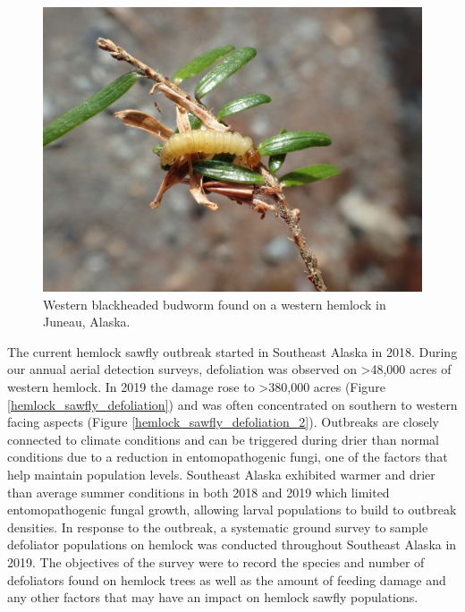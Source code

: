 \begin{multicols}{2} 

\begin{figure}[H]
\begin{center}
\vspace{2mm}
\includegraphics[width=\textwidth]{img/western_blackheaded_budworm_larva.jpg}
\caption{Western blackheaded budworm found on a western hemlock in Juneau, Alaska.}
\label{western_blackheaded_budworm_larva}
\end{center}
\end{figure} 

The current hemlock sawfly outbreak started in Southeast Alaska in 2018.  During our annual aerial detection surveys, defoliation was observed on >48,000 acres of western hemlock.  In 2019 the damage rose to >380,000 acres (Figure \ref{hemlock_sawfly_defoliation}) and was often concentrated on southern to western facing aspects (Figure \ref{hemlock_sawfly_defoliation_2}). Outbreaks are closely connected to climate conditions and can be triggered during drier than normal conditions due to a reduction in entomopathogenic fungi, one of the factors that help maintain population levels.   Southeast Alaska exhibited warmer and drier than average summer conditions in both 2018 and 2019 which limited entomopathogenic fungal growth, allowing larval populations to build to outbreak densities. In response to the outbreak, a systematic ground survey to sample defoliator populations on hemlock was conducted throughout Southeast Alaska in 2019.  The objectives of the survey were to record the species and number of defoliators found on hemlock trees as well as the amount of feeding damage and any other factors that may have an impact on hemlock sawfly populations.


\end{multicols}
